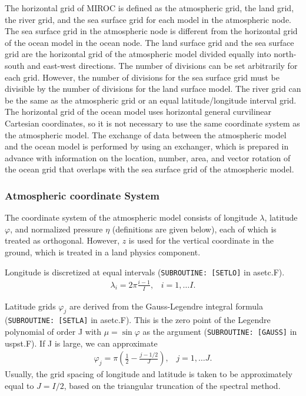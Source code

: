 The horizontal grid of MIROC is defined as the atmospheric grid, the
land grid, the river grid, and the sea surface grid for each model in
the atmospheric node. The sea surface grid in the atmospheric node is
different from the horizontal grid of the ocean model in the ocean node.
The land surface grid and the sea surface grid are the horizontal grid
of the atmospheric model divided equally into north-south and east-west
directions. The number of divisions can be set arbitrarily for each
grid. However, the number of divisions for the sea surface grid must be
divisible by the number of divisions for the land surface model. The
river grid can be the same as the atmospheric grid or an equal
latitude/longitude interval grid. The horizontal grid of the ocean model
uses horizontal general curvilinear Cartesian coordinates, so it is not
necessary to use the same coordinate system as the atmospheric model.
The exchange of data between the atmospheric model and the ocean model
is performed by using an exchanger, which is prepared in advance with
information on the location, number, area, and vector rotation of the
ocean grid that overlaps with the sea surface grid of the atmospheric
model.

\hypertarget{atmospheric-coordinate-system}{%
\subsubsection{Atmospheric coordinate System}\label{atmospheric-ccoordinate-system}}

The coordinate system of the atmospheric model consists of longitude \(\lambda\), latitude
\(\varphi\), and normalized pressure \(\eta\) (definitions are given
below), each of which is treated as orthogonal.
However, \(z\) is used
for the vertical coordinate in the ground, which is treated in a land physics component.

Longitude is discretized at equal intervals
(\texttt{SUBROUTINE:\ {[}SETLO{]}} in asetc.F).
\begin{eqnarray}
  \lambda_i = 2 \pi \frac{i-1}{I},  \;\;\; i = 1, \ldots I.
\end{eqnarray}

Latitude grids \(\varphi_j\) are derived from the
Gauss-Legendre integral formula (\texttt{SUBROUTINE:\ {[}SETLA{]}} in
asetc.F).
This is the zero point of the Legendre polynomial of order J
with \(\mu = \sin \varphi\) as the argument
(\texttt{SUBROUTINE:\ {[}GAUSS{]}} in uspst.F).
If J is large, we can approximate
\begin{eqnarray}
  \varphi_j =  \pi \left( \frac{1}{2}- \frac{j-1/2}{J} \right), \;\;\; j = 1, \ldots J.
\end{eqnarray}
Usually, the grid spacing of longitude and latitude is taken to be
approximately equal to \(J = I/2\), based on the triangular truncation of the spectral method.

